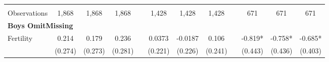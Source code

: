 \begin{landscape}
\begin{table}[htpb!]
\begin{center}
\begin{tabular}{lcccp{2mm}cccp{2mm}ccc}
\begin{footnotesize}\end{footnotesize}&\begin{footnotesize}\end{footnotesize}&\begin{footnotesize}\end{footnotesize}&\begin{footnotesize}\end{footnotesize}&\begin{footnotesize}\end{footnotesize}&\begin{footnotesize}\end{footnotesize}&\begin{footnotesize}\end{footnotesize}&\begin{footnotesize}\end{footnotesize}&\begin{footnotesize}\end{footnotesize}&\begin{footnotesize}\end{footnotesize}&\begin{footnotesize}\end{footnotesize}&\begin{footnotesize}\end{footnotesize}\\Observations&1,868&1,868&1,868&&1,428&1,428&1,428&&671&671&671\\
\multicolumn{12}{l}{\textbf{Boys OmitMissing}}\\ 
Fertility&0.214&0.179&0.236&&0.0373&-0.0187&0.106&&-0.819*&-0.758*&-0.685*\\
&(0.274)&(0.273)&(0.281)&&(0.221)&(0.226)&(0.241)&&(0.443)&(0.436)&(0.403)\\

\end{tabular}
\end{center}
\end{table}
\end{landscape}
